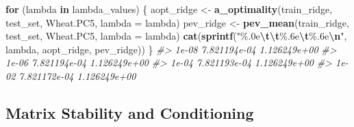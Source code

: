 \documentclass[
]{article}
\newenvironment{Shaded}{\begin{snugshade}}{\end{snugshade}}
\newcommand{\AttributeTok}[1]{\textcolor[rgb]{0.13,0.29,0.53}{#1}}
\newcommand{\CommentTok}[1]{\textcolor[rgb]{0.56,0.35,0.01}{\textit{#1}}}
\newcommand{\ControlFlowTok}[1]{\textcolor[rgb]{0.13,0.29,0.53}{\textbf{#1}}}
\newcommand{\FunctionTok}[1]{\textcolor[rgb]{0.13,0.29,0.53}{\textbf{#1}}}
\newcommand{\NormalTok}[1]{#1}
\newcommand{\OtherTok}[1]{\textcolor[rgb]{0.56,0.35,0.01}{#1}}
\newcommand{\SpecialCharTok}[1]{\textcolor[rgb]{0.81,0.36,0.00}{\textbf{#1}}}
\newcommand{\StringTok}[1]{\textcolor[rgb]{0.31,0.60,0.02}{#1}}
\begin{document}
\begin{Shaded}
\begin{Highlighting}[]
\ControlFlowTok{for}\NormalTok{ (lambda }\ControlFlowTok{in}\NormalTok{ lambda\_values) \{}
\NormalTok{  aopt\_ridge }\OtherTok{\textless{}{-}} \FunctionTok{a\_optimality}\NormalTok{(train\_ridge, test\_set, Wheat.PC5, }\AttributeTok{lambda =}\NormalTok{ lambda)}
\NormalTok{  pev\_ridge }\OtherTok{\textless{}{-}} \FunctionTok{pev\_mean}\NormalTok{(train\_ridge, test\_set, Wheat.PC5, }\AttributeTok{lambda =}\NormalTok{ lambda)}
  \FunctionTok{cat}\NormalTok{(}\FunctionTok{sprintf}\NormalTok{(}\StringTok{"\%.0e}\SpecialCharTok{\textbackslash{}t\textbackslash{}t}\StringTok{\%.6e}\SpecialCharTok{\textbackslash{}t}\StringTok{\%.6e}\SpecialCharTok{\textbackslash{}n}\StringTok{"}\NormalTok{, lambda, aopt\_ridge, pev\_ridge))}
\NormalTok{\}}
\CommentTok{\#\textgreater{} 1e{-}08        7.821194e{-}04    1.126249e+00}
\CommentTok{\#\textgreater{} 1e{-}06        7.821194e{-}04    1.126249e+00}
\CommentTok{\#\textgreater{} 1e{-}04        7.821193e{-}04    1.126249e+00}
\CommentTok{\#\textgreater{} 1e{-}02        7.821172e{-}04    1.126249e+00}
\end{Highlighting}
\end{Shaded}

\subsection{Matrix Stability and
Conditioning}\label{matrix-stability-and-conditioning}
\end{document}
